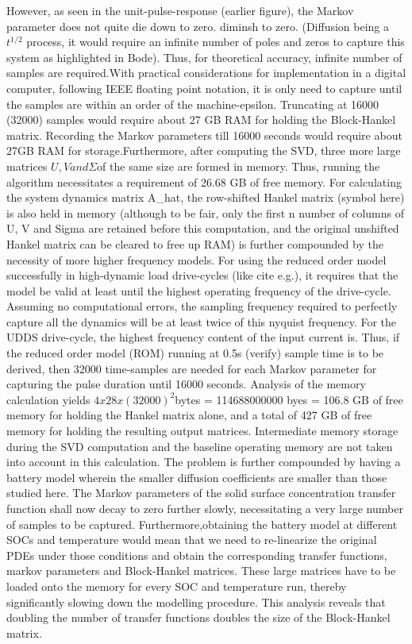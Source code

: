 However, as seen in the unit-pulse-response (earlier figure), the
Markov parameter does not quite die down to zero.
diminsh to zero. (Diffusion being a $t^{1/2}$ process, it would require
an infinite number of poles and zeros to capture this system as highlighted
in Bode). Thus, for theoretical accuracy, infinite number of samples
are required.With practical considerations for implementation in a
digital computer, following IEEE floating point notation, it is only
need to capture until the samples are within an order of the machine-epsilon.
Truncating at 16000 (32000) samples would require about 27 GB RAM
for holding the Block-Hankel matrix.
Recording the Markov
parameters till 16000 seconds would require about 27GB RAM for storage.Furthermore,
after computing the SVD, three more large matrices $U,Vand\Sigma$of
the same size are formed in memory. Thus, running the algorithm necessitates
a requirement of 26.68 GB of free memory. For calculating the system
dynamics matrix A\_hat, the row-shifted Hankel matrix (symbol here)
is also held in memory (although to be fair, only the first n number
of columns of U, V and Sigma are retained before this computation,
and the original unshifted Hankel matrix can be cleared to free up
RAM) is further compounded by the necessity of more higher frequency
models. For using the reduced order model successfully in high-dynamic
load drive-cycles (like cite e.g.), it requires that the model be
valid at least until the highest operating frequency of the drive-cycle.
Assuming no computational errors, the sampling frequency required
to perfectly capture all the dynamics will be at least twice of this
nyquist frequency. For the UDDS drive-cycle, the highest frequency
content of the input current is. Thus, if the reduced order model
(ROM) running at 0.5s (verify) sample time is to be derived, then
32000 time-samples are needed for each Markov parameter for capturing
the pulse duration until 16000 seconds. Analysis of the memory calculation
yields $4x28x(32000)^{2}$bytes = 114688000000 byes = 106.8 GB of
free memory for holding the Hankel matrix alone, and a total of 427
GB of free memory for holding the resulting output matrices. Intermediate
memory storage during the SVD computation and the baseline operating
memory are not taken into account in this calculation. The problem
is further compounded by having a battery model wherein the smaller
diffusion coefficients are smaller than those studied here. The Markov
parameters of the solid surface concentration transfer function shall
now decay to zero further slowly, necessitating a very large number
of samples to be captured. Furthermore,obtaining the battery model
at different SOCs and temperature would mean that we need to re-linearize
the original PDEs under those conditions and obtain the corresponding
transfer functions, markov parameters and Block-Hankel matrices. These
large matrices have to be loaded onto the memory for every SOC and
temperature run, thereby significantly slowing down the modelling
procedure. This analysis reveals that doubling the number of transfer
functions doubles the size of the Block-Hankel matrix.


